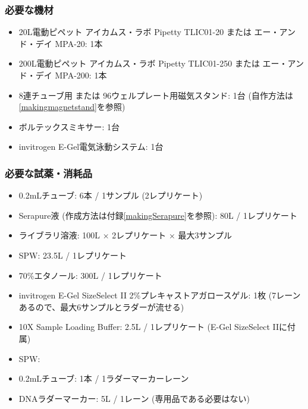 \documentclass[titlepage,10pt,a4paper,uplatex]{jsbook}
\begin{document}
\subsubsection{必要な機材}
\begin{itemize}
\item 20{\textmu}L電動ピペット アイカムス・ラボ Pipetty TLIC01-20 または エー・アンド・デイ MPA-20: 1本
\item 200{\textmu}L電動ピペット アイカムス・ラボ Pipetty TLIC01-250 または エー・アンド・デイ MPA-200: 1本
\item 8連チューブ用 または 96ウェルプレート用磁気スタンド: 1台 (自作方法は\ref{makingmagnetstand}を参照)
\item ボルテックスミキサー: 1台
\item invitrogen E-Gel電気泳動システム: 1台
\end{itemize}

\subsubsection{必要な試薬・消耗品}
\begin{itemize}
\item 0.2mLチューブ: 6本 / 1サンプル (2レプリケート)
\item Serapure液 (作成方法は付録\ref{makingSerapure}を参照): 80{\textmu}L / 1レプリケート
\item ライブラリ溶液: 100{\textmu}L × 2レプリケート × 最大3サンプル
\item SPW: 23.5{\textmu}L / 1レプリケート
\item 70\%エタノール: 300{\textmu}L / 1レプリケート
\item invitrogen E-Gel SizeSelect II 2\%プレキャストアガロースゲル: 1枚 (7レーンあるので、最大6サンプルとラダーが流せる)
\item 10X Sample Loading Buffer: 2.5{\textmu}L / 1レプリケート (E-Gel SizeSelect IIに付属)
\item SPW: 
\item 0.2mLチューブ: 1本 / 1ラダーマーカーレーン
\item DNAラダーマーカー: 5{\textmu}L / 1レーン (専用品である必要はない)
\end{itemize}
\end{document}
